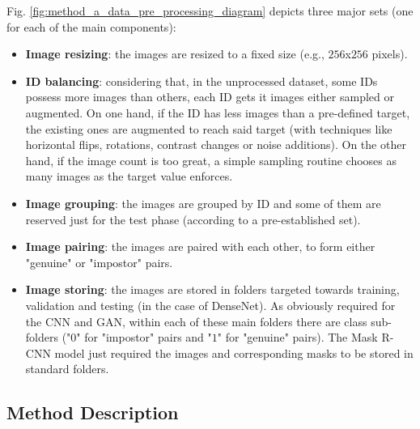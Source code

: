 Fig. \ref{fig:method_a_data_pre_processing_diagram} depicts three major sets (one for each of the main components):

\begin{itemize}
    \item \textbf{Image resizing}: the images are resized to a fixed size (e.g., $256$x$256$ pixels).
    \item \textbf{ID balancing}: considering that, in the unprocessed dataset, some IDs possess more images than others, each ID gets it images either sampled or augmented. On one hand, if the ID has less images than a pre-defined target, the existing ones are augmented to reach said target (with techniques like horizontal flips, rotations, contrast changes or noise additions). On the other hand, if the image count is too great, a simple sampling routine chooses as many images as the target value enforces.
    \item \textbf{Image grouping}: the images are grouped by ID and some of them are reserved just for the test phase (according to a pre-established set).
    \item \textbf{Image pairing}: the images are paired with each other, to form either "genuine" or "impostor" pairs.
    \item \textbf{Image storing}: the images are stored in folders targeted towards training, validation and testing (in the case of DenseNet). As obviously required for the \ac{CNN} and \ac{GAN}, within each of these main folders there are class sub-folders ("$0$" for "impostor" pairs and "$1$" for "genuine" pairs). The Mask \ac{R-CNN} model just required the images and corresponding masks to be stored in standard folders.
\end{itemize}

\subsection{Method Description}
\label{subsec:chap3_method_a_description}

